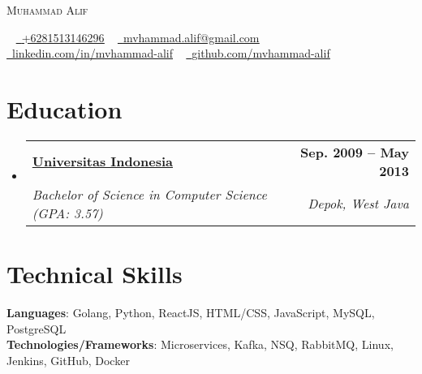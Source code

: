 \documentclass[letterpaper,11pt]{article}
\makeatletter
\newcommand{\resumeSubheading}[4]{
  \vspace{-2pt}\item
  \begin{tabular*}{1.0\textwidth}[t]{l@{\extracolsep{\fill}}r}
    \textbf{#1} & \textbf{\small #2} \\
    \textit{\small#3} & \textit{\small #4} \\
  \end{tabular*}\vspace{-7pt}
}
\newcommand{\resumeSubHeadingListStart}{\begin{itemize}[leftmargin=0.0in, label={}]}
\newcommand{\resumeSubHeadingListEnd}{\end{itemize}}
\makeatother
\begin{document}

\begin{center}
{\Huge \scshape Muhammad Alif} \\ \vspace{1pt}
\end{center}
\begin{center}
\small \raisebox{-0.1\height} ~
\href{tel:+6281513146296}{\raisebox{-0.2\height}\faPhone\  \underline{+6281513146296}} ~
\href{mailto:mvhammad.alif@gmail.com}{\raisebox{-0.2\height}\faEnvelope\  \underline{mvhammad.alif@gmail.com}} ~
\href{https://linkedin.com/in/mvhammad-alif/}{\raisebox{-0.2\height}\faLinkedin\ \underline{linkedin.com/in/mvhammad-alif}}  ~
\href{https://github.com/mvhammad-alif}{\raisebox{-0.2\height}\faGithub\ \underline{github.com/mvhammad-alif}}
\vspace{-8pt}
\end{center}

\hspace{1pt}
\section{Education}
\resumeSubHeadingListStart
\resumeSubheading
{\href{https://ui.ac.id/}{Universitas Indonesia}}{Sep. 2009 -- May 2013}
{Bachelor of Science in Computer Science (GPA: 3.57)}{Depok, West Java}
\resumeSubHeadingListEnd

%
\section{Technical Skills}
\begin{itemize}[leftmargin=0.15in, label={}]
\small{\item{
\textbf{Languages}{: Golang, Python, ReactJS, HTML/CSS, JavaScript, MySQL, PostgreSQL} \\
\textbf{Technologies/Frameworks}{: Microservices, Kafka, NSQ, RabbitMQ, Linux, Jenkins, GitHub, Docker} \\
}}
\end{itemize}
\end{document}

